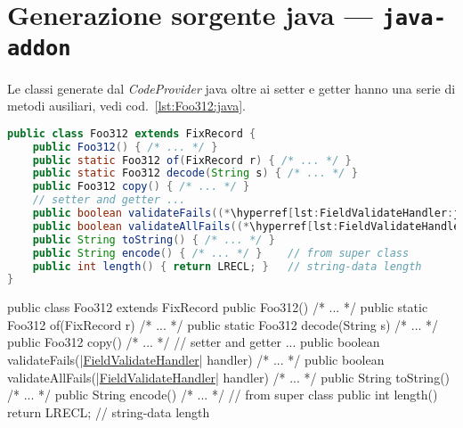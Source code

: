 \section{Generazione sorgente java --- \texttt{java-addon}} 
\label{sec:java.addon}
Le classi generate dal \textsl{CodeProvider} java oltre ai setter e getter
hanno una serie di metodi ausiliari, vedi cod.~\ref{lst:Foo312:java}.


\ifesource
\begin{figure*}[!htb]
\begin{lstlisting}[language=java, caption=esempio di classe generata (Foo312), 
label=lst:Foo312:java]
public class Foo312 extends FixRecord {
    public Foo312() { /* ... */ }
    public static Foo312 of(FixRecord r) { /* ... */ }
    public static Foo312 decode(String s) { /* ... */ }
    public Foo312 copy() { /* ... */ }
    // setter and getter ...
    public boolean validateFails((*\hyperref[lst:FieldValidateHandler:java]{FieldValidateHandler}*) handler) { /* ... */ }
    public boolean validateAllFails((*\hyperref[lst:FieldValidateHandler:java]{FieldValidateHandler}*) handler) { /* ... */ }
    public String toString() { /* ... */ }
    public String encode() { /* ... */ }    // from super class
    public int length() { return LRECL; }   // string-data length
}
\end{lstlisting}
\end{figure*}
\else
\begin{elisting}[!htb]
\begin{javacode}
public class Foo312 extends FixRecord {
    public Foo312() { /* ... */ }
    public static Foo312 of(FixRecord r) { /* ... */ }
    public static Foo312 decode(String s) { /* ... */ }
    public Foo312 copy() { /* ... */ }
    // setter and getter ...
    public boolean validateFails(|\hyperref[lst:FieldValidateHandler:java]{FieldValidateHandler}| handler) { /* ... */ }
    public boolean validateAllFails(|\hyperref[lst:FieldValidateHandler:java]{FieldValidateHandler}| handler) { /* ... */ }
    public String toString() { /* ... */ }
    public String encode() { /* ... */ }    // from super class
    public int length() { return LRECL; }   // string-data length
}
\end{javacode}
\caption{esempio di classe generata (Foo312)}
\label{lst:Foo312:java}
\end{elisting}
\fi

